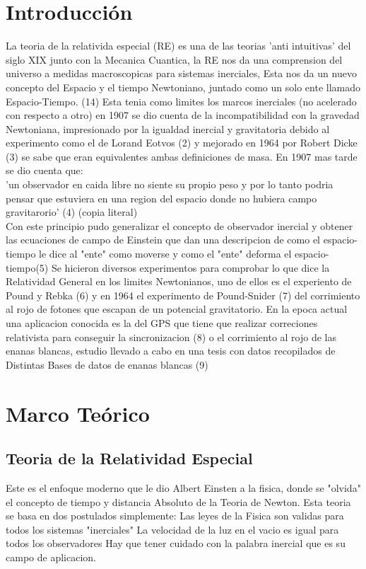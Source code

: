 \documentclass[12pt,twoside]{rif}
\begin{document}
	
	
	\newpage
	
	\tableofcontents
	
	\section{ Introducción} 
	La teoria de la relativida especial (RE) es una de las teorias 'anti intuitivas' del siglo XIX junto con la Mecanica
Cuantica, la RE nos da una comprension del universo a medidas macroscopicas para sistemas inerciales, Esta nos da un nuevo
concepto del Espacio y el tiempo Newtoniano, juntado como un solo ente llamado Espacio-Tiempo. (14)
Esta tenia como limites los marcos inerciales (no acelerado con respecto a otro) en 1907 se dio cuenta de la
incompatibilidad con la gravedad Newtoniana, impresionado por la igualdad inercial y gravitatoria debido al experimento 
como el de Lorand Eotvos (2) y mejorado en 1964 por Robert Dicke (3) se sabe que eran equivalentes ambas definiciones de masa.
En 1907 mas tarde se dio cuenta que: \\

 'un observador en caida libre no siente su propio peso y por lo tanto podria pensar que estuviera en una region del espacio donde no hubiera campo gravitarorio' (4) (copia literal)\\

Con este principio pudo generalizar el concepto de observador inercial y obtener las ecuaciones de campo de Einstein que dan
una descripcion de como el espacio-tiempo le dice al "ente" como moverse y como el "ente" deforma el espacio-tiempo(5)
Se hicieron diversos experimentos para comprobar lo que dice la Relatividad General en los limites Newtonianos, uno de ellos 
es el experiento de  Pound y Rebka (6) y en 1964 el experimento de Pound-Snider (7) del corrimiento al rojo de fotones que
escapan de un potencial gravitatorio.
En la epoca actual una aplicacion conocida es la del GPS que tiene que realizar correciones relativista para conseguir la 
sincronizacion (8) o el corrimiento al rojo de las enanas blancas, estudio llevado a cabo en una tesis con datos recopilados de 
Distintas Bases de datos de enanas blancas (9)
	\section{Marco Teórico}
	\subsection{Teoria de la Relatividad Especial}
	Este es el enfoque moderno que le dio Albert Einsten a la fisica, donde se "olvida" el concepto de tiempo y distancia Absoluto de la Teoria de Newton.
	Esta teoria se basa en dos postulados simplemente:
	Las leyes de la Fisica son validas para todos los sistemas "inerciales"
	 La velocidad de la luz en el vacio es igual para todos los observadores 
	Hay que tener cuidado con la palabra inercial que es su campo de aplicacion.
\end{document}
